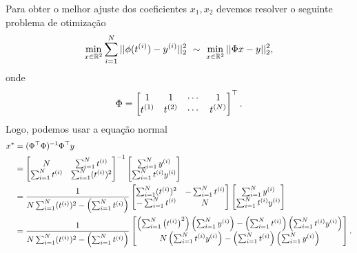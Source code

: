 \begin{questions}
\begin{solution}
Para obter o melhor ajuste dos coeficientes $x_1,x_2$ devemos resolver o seguinte problema de otimização
\[
    \min_{x\in{\mathbb R}^2} \sum_{i=1}^N||\phi(t^{(i)})-y^{(i)}||_2^2
    ~\sim~ \min_{x\in{\mathbb R}^2} ||\Phi x - y||_2^2,
\]
onde
\[
    \Phi =
    \begin{bmatrix}
        1       & 1       & \cdots & 1 \\
        t^{(1)} & t^{(2)} & \cdots & t^{(N)}
    \end{bmatrix}^\top.
\]
  Logo, podemos usar a equação normal
  \begin{align*}
      x^* &= (\Phi^\top \Phi)^{-1}\Phi^\top y \\
        &=  \begin{bmatrix}
                N   & \sum_{i=1}^N t^{(i)} \\
                \sum_{i=1}^N t^{(i)} & \sum_{i=1}^N (t^{(i)})^2
            \end{bmatrix}^{-1}
            \begin{bmatrix}
                \sum_{i=1}^N y^{(i)}\\
                \sum_{i=1}^N t^{(i)}y^{(i)}\\
            \end{bmatrix}\\
        &=  \frac{1}{N\sum_{i=1}^N (t^{(i)})^2-\left(\sum_{i=1}^N t^{(i)}\right)}
            \begin{bmatrix}
                \sum_{i=1}^N (t^{(i)})^2 & -\sum_{i=1}^N t^{(i)} \\
                -\sum_{i=1}^N t^{(i)} & N
            \end{bmatrix}
            \begin{bmatrix}
                \sum_{i=1}^N y^{(i)}\\
                \sum_{i=1}^N t^{(i)}y^{(i)}\\
            \end{bmatrix}\\
        &=  \frac{1}{N\sum_{i=1}^N (t^{(i)})^2-\left(\sum_{i=1}^N t^{(i)}\right)}
            \begin{bmatrix}
                \left( \sum_{i = 1}^N \left(t^{(i)}\right)^2 \right) \left( \sum_{i =1}^N y^{(i)} \right) - \left( \sum_{i = 1}^N t^{(i)} \right) \left( \sum_{i =1}^N t^{(i)} y^{(i)} \right)\\
                N \left( \sum_{i =1}^N t^{(i)} y^{(i)} \right) - \left( \sum_{i = 1}^N t^{(i)} \right) \left( \sum_{i =1}^N y^{(i)} \right)
            \end{bmatrix}.
  \end{align*}
\end{solution}


\end{questions}
